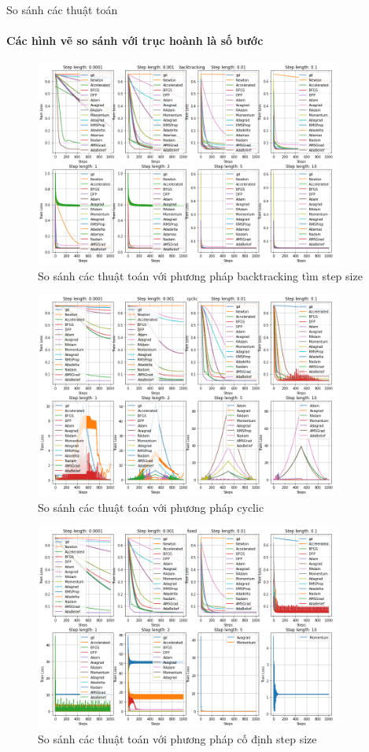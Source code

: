 \documentclass[10pt]{beamer}
\theoremstyle{remark}
\theoremstyle{definition}
\begin{document}
\begin{frame}[allowframebreaks]{So sánh các thuật toán}
	\framesubtitle{Các hình vẽ so sánh với trục hoành là số bước}
	\begin{figure}
		\centering
		\includegraphics[width=10cm]{Thanh/backtrack-lr-step-op_step.png}
		\caption{So sánh các thuật toán với phương pháp backtracking tìm step size}
	\end{figure}

	\begin{figure}
		\centering
		\includegraphics[width=10cm]{Thanh/cyclic-lr-step-op_step.png}
		\caption{So sánh các thuật toán với phương pháp cyclic}
	\end{figure}

	\begin{figure}
		\centering
		\includegraphics[width=10cm]{Thanh/fixed-lr-step-op_step.png}
		\caption{So sánh các thuật toán với phương pháp cố định step size}
	\end{figure}


\end{frame}
\end{document}
